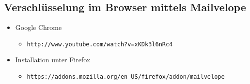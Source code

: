 \documentclass[a5paper]{scrartcl}
\begin{document}
\subsection*{Verschlüsselung im Browser mittels Mailvelope}
\begin{itemize}
    \item Google Chrome
       \begin{itemize}
               \item \texttt{http://www.youtube.com/watch?v=xKDk3l6nRc4}
       \end{itemize}
    \item Installation unter Firefox
       \begin{itemize}
               \item \texttt{https://addons.mozilla.org/en-US/firefox/addon/mailvelope} 
       \end{itemize}
\end{itemize}
\end{document}
